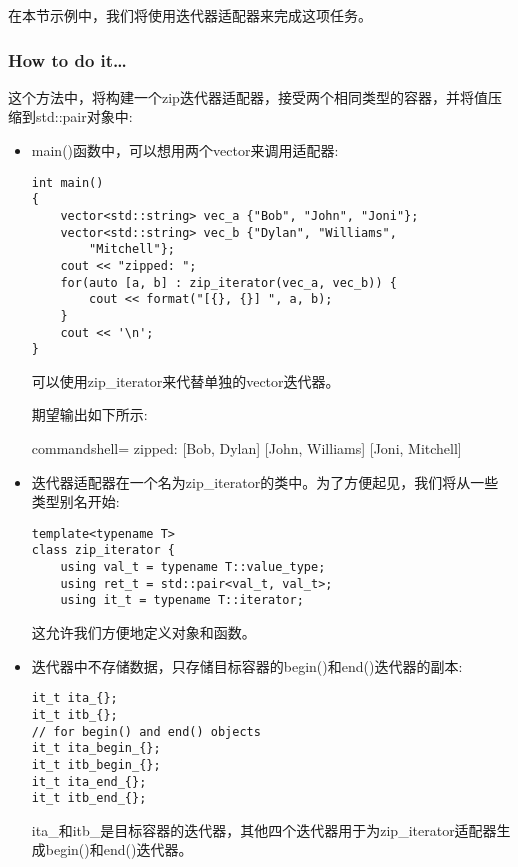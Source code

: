 在本节示例中，我们将使用迭代器适配器来完成这项任务。

\subsubsection{How to do it…}

这个方法中，将构建一个zip迭代器适配器，接受两个相同类型的容器，并将值压缩到std::pair对象中:

\begin{itemize}
\item 
main()函数中，可以想用两个vector来调用适配器:

\begin{lstlisting}[style=styleCXX]
int main()
{
	vector<std::string> vec_a {"Bob", "John", "Joni"};
	vector<std::string> vec_b {"Dylan", "Williams",
		"Mitchell"};
	cout << "zipped: ";
	for(auto [a, b] : zip_iterator(vec_a, vec_b)) {
		cout << format("[{}, {}] ", a, b);
	}
	cout << '\n';
}
\end{lstlisting}

可以使用zip\_iterator来代替单独的vector迭代器。

期望输出如下所示:

\begin{tcblisting}{commandshell={}}
zipped: [Bob, Dylan] [John, Williams] [Joni, Mitchell]
\end{tcblisting}

\item 
迭代器适配器在一个名为zip\_iterator的类中。为了方便起见，我们将从一些类型别名开始:

\begin{lstlisting}[style=styleCXX]
template<typename T>
class zip_iterator {
	using val_t = typename T::value_type;
	using ret_t = std::pair<val_t, val_t>;
	using it_t = typename T::iterator;
\end{lstlisting}

这允许我们方便地定义对象和函数。

\item 
迭代器中不存储数据，只存储目标容器的begin()和end()迭代器的副本:

\begin{lstlisting}[style=styleCXX]
it_t ita_{};
it_t itb_{};
// for begin() and end() objects
it_t ita_begin_{};
it_t itb_begin_{};
it_t ita_end_{};
it_t itb_end_{};
\end{lstlisting}

ita\_和itb\_是目标容器的迭代器，其他四个迭代器用于为zip\_iterator适配器生成begin()和end()迭代器。


\end{itemize}
